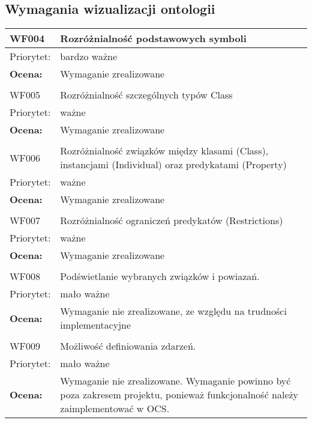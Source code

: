\documentclass[a4paper,10pt]{article}
\begin{document}
\subsection{Wymagania wizualizacji ontologii}

\begin{center}
\begin{tabular}{|m{3cm}|m{9cm}|} \hline

WF004 & Rozróżnialność podstawowych symboli  \\ \hline
Priorytet: & bardzo ważne \\ \hline
\textbf{Ocena:} & Wymaganie zrealizowane \\ \hline

\multicolumn{2}{c}{} \\
 \hline

WF005 &   Rozróżnialność szczególnych typów Class\\ \hline
Priorytet: &  ważne \\ \hline
\textbf{Ocena:} & Wymaganie zrealizowane \\ \hline
\multicolumn{2}{c}{} \\
 \hline

WF006 &  Rozróżnialność związków między klasami (Class), instancjami (Individual) oraz predykatami (Property)\\ \hline
Priorytet: & ważne \\ \hline
\textbf{Ocena:} & Wymaganie zrealizowane \\ \hline
\multicolumn{2}{c}{} \\
 \hline

WF007 & Rozróżnialność ograniczeń predykatów (Restrictions) \\ \hline
Priorytet: & ważne \\ \hline
\textbf{Ocena:} & Wymaganie zrealizowane \\ \hline
\multicolumn{2}{c}{} \\
 \hline

WF008 &  Podświetlanie wybranych związków i powiazań.\\ \hline
Priorytet: & mało ważne \\ \hline
\textbf{Ocena:} & Wymaganie nie zrealizowane, ze względu na trudności implementacyjne \\ \hline
\multicolumn{2}{c}{} \\
 \hline

WF009 & Możliwość definiowania zdarzeń. \\ \hline
Priorytet: & mało ważne \\ \hline
\textbf{Ocena:} & Wymaganie nie zrealizowane. Wymaganie powinno być poza zakresem projektu, ponieważ funkcjonalność należy zaimplementować w OCS. \\ \hline
\end{tabular}

\end{center}
\end{document}
